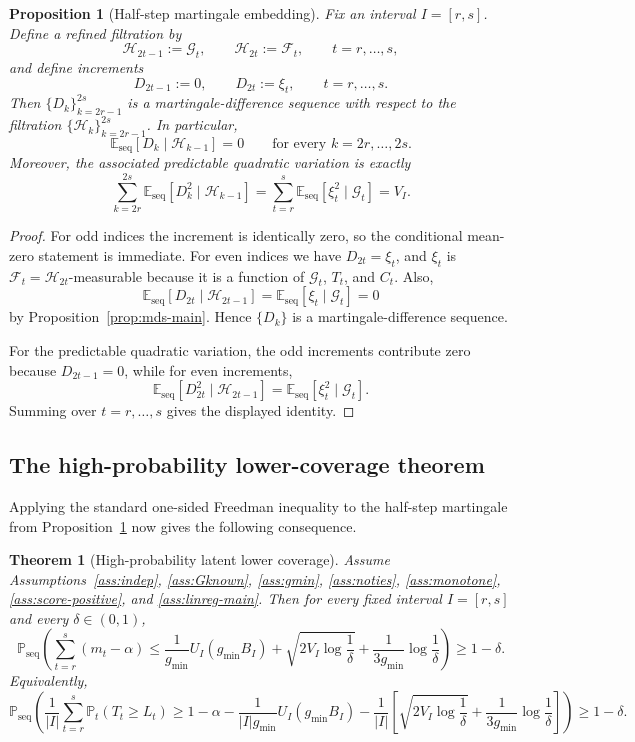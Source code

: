\documentclass[11pt]{article}
\newtheorem{theorem}{Theorem}
\newtheorem{proposition}{Proposition}
\newcommand{\E}{\mathbb{E}}
\newcommand{\Prob}{\mathbb{P}}
\newcommand{\1}{\mathbf{1}}
\newcommand{\seq}{\mathrm{seq}}
\newcommand{\cG}{\mathcal{G}}
\newcommand{\cF}{\mathcal{F}}
\newcommand{\cH}{\mathcal{H}}
\begin{document}
\begin{proposition}[Half-step martingale embedding]
\label{prop:half-step-martingale}
Fix an interval $I=[r,s]$. Define a refined filtration by
\[
\cH_{2t-1}:=\cG_t,
\qquad
\cH_{2t}:=\cF_t,
\qquad t=r,\dots,s,
\]
and define increments
\[
D_{2t-1}:=0,
\qquad
D_{2t}:=\xi_t,
\qquad t=r,\dots,s.
\]
Then $\{D_k\}_{k=2r-1}^{2s}$ is a martingale-difference sequence with respect to the filtration $\{\cH_k\}_{k=2r-1}^{2s}$. In particular,
\[
\E_{\seq}[D_k\mid \cH_{k-1}]=0
\qquad\text{for every }k=2r,\dots,2s.
\]
Moreover, the associated predictable quadratic variation is exactly
\[
\sum_{k=2r}^{2s}\E_{\seq}[D_k^2\mid \cH_{k-1}]
=
\sum_{t=r}^s\E_{\seq}[\xi_t^2\mid \cG_t]
=V_I.
\]
\end{proposition}

\begin{proof}
For odd indices the increment is identically zero, so the conditional mean-zero statement is immediate. For even indices we have $D_{2t}=\xi_t$, and $\xi_t$ is $\cF_t=\cH_{2t}$-measurable because it is a function of $\cG_t$, $T_t$, and $C_t$. Also,
\[
\E_{\seq}[D_{2t}\mid \cH_{2t-1}]
=
\E_{\seq}[\xi_t\mid \cG_t]
=
0
\]
by Proposition~\ref{prop:mds-main}. Hence $\{D_k\}$ is a martingale-difference sequence.

For the predictable quadratic variation, the odd increments contribute zero because $D_{2t-1}=0$, while for even increments,
\[
\E_{\seq}[D_{2t}^2\mid \cH_{2t-1}]
=
\E_{\seq}[\xi_t^2\mid \cG_t].
\]
Summing over $t=r,\dots,s$ gives the displayed identity.
\end{proof}


\subsection{The high-probability lower-coverage theorem}

Applying the standard one-sided Freedman inequality to the half-step martingale from Proposition~\ref{prop:half-step-martingale} now gives the following consequence.

\begin{theorem}[High-probability latent lower coverage]
\label{thm:freedman-main}
Assume Assumptions~\ref{ass:indep}, \ref{ass:Gknown}, \ref{ass:gmin}, \ref{ass:noties}, \ref{ass:monotone}, \ref{ass:score-positive}, and \ref{ass:linreg-main}. Then for every fixed interval $I=[r,s]$ and every $\delta\in(0,1)$,
\[
\Prob_{\seq}\!\left(
\sum_{t=r}^s(m_t-\alpha)
\le
\frac{1}{g_{\min}}U_I(g_{\min}B_I)
+
\sqrt{2V_I\log\frac{1}{\delta}}
+
\frac{1}{3g_{\min}}\log\frac{1}{\delta}
\right)
\ge 1-\delta.
\]
Equivalently,
\[
\Prob_{\seq}\!\left(
\frac{1}{|I|}\sum_{t=r}^s\Prob_t(T_t\ge L_t)
\ge
1-\alpha
-
\frac{1}{|I|g_{\min}}U_I(g_{\min}B_I)
-
\frac{1}{|I|}\left[
\sqrt{2V_I\log\frac{1}{\delta}}
+
\frac{1}{3g_{\min}}\log\frac{1}{\delta}
\right]
\right)
\ge 1-\delta.
\]
\end{theorem}
\end{document}
